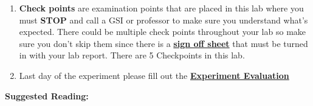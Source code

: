 \documentclass{../lab}
\begin{document}
\begin{enumerate}
    \item \textbf{Check points} are examination points that are placed in this lab where you must \textbf{STOP} and call a GSI or professor to make sure you understand what's expected. There could  be multiple check points throughout your lab so make sure you don't skip them since there is a \href{http://experimentationlab.berkeley.edu/checkpointsmot}{\textbf{sign off sheet}} that must be turned in with your lab report. There are 5 Checkpoints in this lab.

    \item Last day of the experiment please fill out the \href{\ExperimentEvaluation}{\textbf{Experiment Evaluation}}
\end{enumerate}

\textbf{Suggested Reading:}
\end{document}
